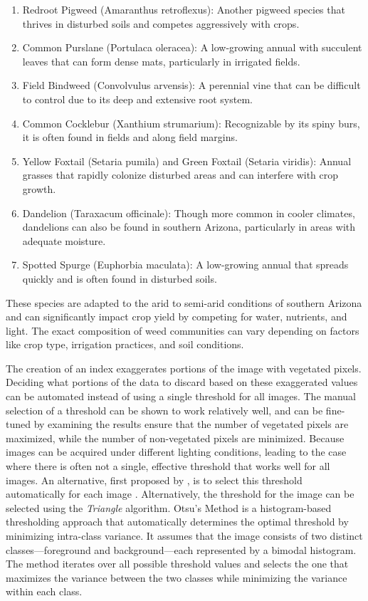 \documentclass[letterpaper]{report}
\begin{document}
{\begin{enumerate}
	\item{Redroot Pigweed (Amaranthus retroflexus): Another pigweed species that thrives in disturbed soils and competes aggressively with crops.}

	\item{Common Purslane (Portulaca oleracea): A low-growing annual with succulent leaves that can form dense mats, particularly in irrigated fields.}

	\item{Field Bindweed (Convolvulus arvensis): A perennial vine that can be difficult to control due to its deep and extensive root system.}

	\item{Common Cocklebur (Xanthium strumarium): Recognizable by its spiny burs, it is often found in fields and along field margins.}

	\item{Yellow Foxtail (Setaria pumila) and Green Foxtail (Setaria viridis): Annual grasses that rapidly colonize disturbed areas and can interfere with crop growth.}

	\item{Dandelion (Taraxacum officinale): Though more common in cooler climates, dandelions can also be found in southern Arizona, particularly in areas with adequate moisture.}

	\item{Spotted Spurge (Euphorbia maculata): A low-growing annual that spreads quickly and is often found in disturbed soils.}
\end{enumerate}

These species are adapted to the arid to semi-arid conditions of southern Arizona and can significantly impact crop yield by competing for water, nutrients, and light. The exact composition of weed communities can vary depending on factors like crop type, irrigation practices, and soil conditions.

The creation of an index exaggerates portions of the image with vegetated pixels. Deciding what portions of the data to discard based on these exaggerated values can be automated instead of using a single threshold for all images. The manual selection of a threshold can be shown to work relatively well, and can be fine-tuned by examining the results ensure that the number of vegetated pixels are maximized, while the number of non-vegetated pixels are minimized. Because images can be acquired under different lighting conditions, leading to the case where there is often not a single, effective threshold that works well for all images. An alternative, first proposed by \citeauthor{Otsu1979-io}, is to select this threshold automatically for each image \cite{Otsu1979-io}. Alternatively, the threshold for the image can be selected using the \textit{Triangle} algorithm.
Otsu’s Method is a histogram-based thresholding approach that automatically determines the optimal threshold by minimizing intra-class variance. It assumes that the image consists of two distinct classes—foreground and background—each represented by a bimodal histogram. The method iterates over all possible threshold values and selects the one that maximizes the variance between the two classes while minimizing the variance within each class.

}
\end{document}
